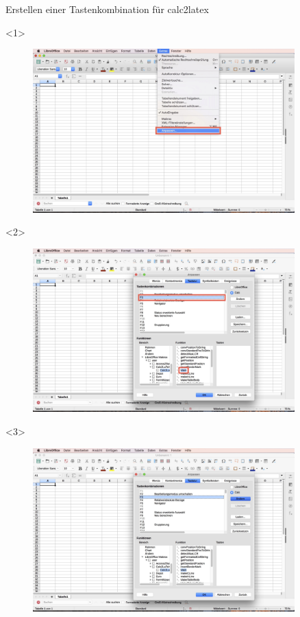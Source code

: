 \documentclass["WS\space 16-17\space -\space LaTeX-Kurs\space -\space Praesentation\space -\space 2.tex"]{subfiles}
\begin{document}
\begin{frame}[c]{Erstellen einer Tastenkombination für calc2latex}
	\begin{onlyenv}
		\begin{figure}[htbp]
			\centering
			\includegraphics[width=0.9\textwidth]{img/Bildschirmfoto_mitKasten/2_Tastenkombination/1.jpg}
		\end{figure}
	\end{onlyenv}
	\begin{onlyenv}
		\begin{figure}[htbp]
			\centering
			\includegraphics[width=0.9\textwidth]{img/Bildschirmfoto_mitKasten/2_Tastenkombination/2.jpg}
		\end{figure}
	\end{onlyenv}
	\begin{onlyenv}
		\begin{figure}[htbp]
			\centering
			\includegraphics[width=0.9\textwidth]{img/Bildschirmfoto_mitKasten/2_Tastenkombination/3.jpg}

\end{figure}
\end{onlyenv}
\end{frame}
\end{document}
